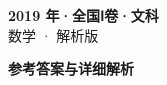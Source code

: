 \documentclass[zihao=-4, a4paper]{ctexart}
\begin{document}
\begin{center}
  {\Large\bfseries 2019 年·全国Ⅰ卷·文科}\\[4pt]
  {\large 数学 · 解析版}
\end{center}
\medskip
{}

\clearpage
{}
\begin{center}{\Large\bfseries 参考答案与详细解析}\end{center}
\medskip

\end{document}
